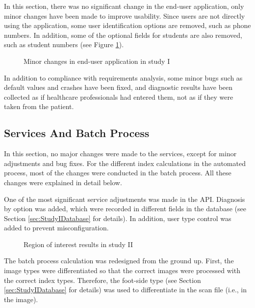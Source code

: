 In this section, there was no significant change in the end-user application, only minor changes have been made to improve usability. Since users are not directly using the application, some user identification options are removed, such as phone numbers. In addition, some of the optional fields for students are also removed, such as student numbers (see Figure \ref{fig:UserApplicationStudyIChanges}).

\begin{figure}[htbp]
\centering
{}
\caption{Minor changes in end-user application in study I}
\label{fig:UserApplicationStudyIChanges}
\end{figure}

In addition to compliance with requirements analysis, some minor bugs such as default values and crashes have been fixed, and diagnostic results have been collected as if healthcare professionals had entered them, not as if they were taken from the patient.

\subsection{Services And Batch Process}

In this section, no major changes were made to the services, except for minor adjustments and bug fixes. For the different index calculations in the automated process, most of the changes were conducted in the batch process. All these changes were explained in detail below.

One of the most significant service adjustments was made in the API. Diagnosis by option was added, which were recorded in different fields in the database (see Section \ref{sec:StudyIDatabase} for details). In addition, user type control was added to prevent misconfiguration.

\begin{figure}[htbp]
\centering
{}
\caption{Region of interest results in study II}
\label{fig:BatchProcessRioStudyII}
\end{figure}

The batch process calculation was redesigned from the ground up. First, the image types were differentiated so that the correct images were processed with the correct index types. Therefore, the foot-side type (see Section \ref{sec:StudyIDatabase} for details) was used to differentiate in the scan file (i.e., in the image).

